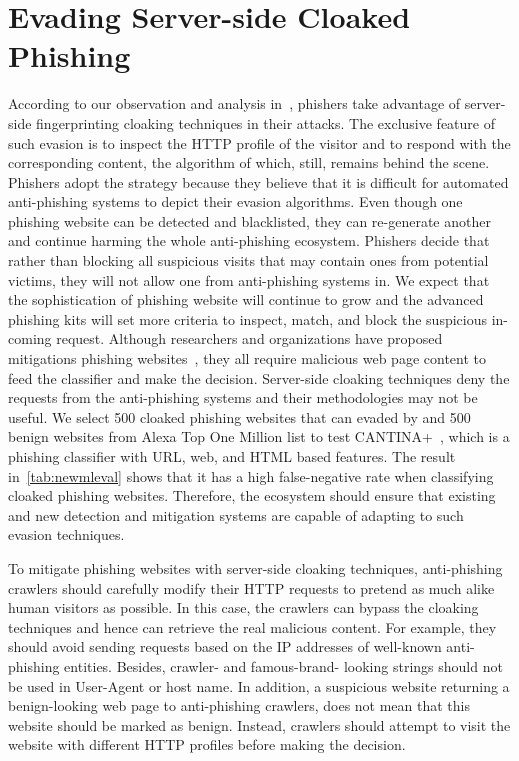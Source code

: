 \section{Evading Server-side Cloaked Phishing}

According to our observation and analysis in~, phishers take advantage of server-side fingerprinting cloaking techniques in their attacks.
The exclusive feature of such evasion is to inspect the HTTP profile of the visitor and to respond with the corresponding content,
the algorithm of which, still, remains behind the scene.
Phishers adopt the strategy because they believe that it is difficult for automated anti-phishing systems to depict their evasion algorithms.
Even though one phishing website can be detected and blacklisted, they can re-generate another and continue harming the whole anti-phishing ecosystem.
Phishers decide that rather than blocking all suspicious visits that may contain ones from potential victims, they will not allow one from anti-phishing systems in.
We expect that the sophistication of phishing website will continue to grow and the advanced phishing kits will set more criteria to inspect, match, and block the suspicious in-coming request.
Although researchers and organizations have proposed mitigations phishing websites~\cite{xiang2011cantina+, lin2021phishpedia}, they all require malicious web page content to feed the classifier and make the decision.
Server-side cloaking techniques deny the requests from the anti-phishing systems and their methodologies may not be useful.
We select 500 cloaked phishing websites that can evaded by \spartacus and 500 benign websites from Alexa Top One Million list to test CANTINA+~\cite{xiang2011cantina+}, which is a phishing classifier with URL, web, and HTML based features.
The result in~\autoref{tab:newmleval} shows that it has a high false-negative rate when classifying cloaked phishing websites.
Therefore, the ecosystem should ensure
that existing and new detection and mitigation systems are capable of adapting to such evasion techniques.

\newmleval

To mitigate phishing websites with server-side cloaking techniques, anti-phishing crawlers should carefully modify their HTTP requests to pretend as much alike human visitors as possible.
In this case, the crawlers can bypass the cloaking techniques and hence can retrieve the real malicious content.
For example, they should avoid sending requests based on the IP addresses of well-known anti-phishing entities.
Besides, crawler- and famous-brand- looking strings should not be used in User-Agent or host name.
In addition, a suspicious website returning a benign-looking web page to anti-phishing crawlers, does not mean that this website should be marked as benign.
Instead, crawlers should attempt to visit the website with different HTTP profiles before making the decision.

